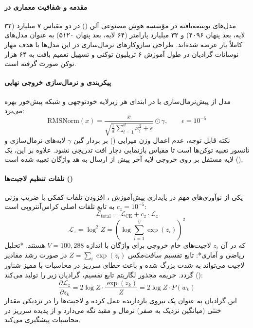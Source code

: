 \item {}

\paragraph*{مقدمه و شفافیت معماری در }
مدل‌های  \cite{olmo2025olmo3} توسعه‌یافته در مؤسسه هوش مصنوعی آلن () در دو مقیاس ۷ میلیارد (۳۲ لایه، بعد پنهان ۴۰۹۶) و ۳۲ میلیارد پارامتر (۶۴ لایه، بعد پنهان ۵۱۲۰) به عنوان مدل‌های کاملاً باز عرضه شده‌اند. طراحی سازوکارهای نرمال‌سازی در این مدل‌ها با هدف مهار نوسانات گرادیان در طول آموزش ۶ تریلیون توکنی و تسهیل تعمیم بافت به ۶۴ هزار توکن صورت گرفته است.

\paragraph*{پیکربندی  و نرمال‌سازی خروجی نهایی}
مدل  از پیش‌نرمال‌سازی با  در ابتدای هر زیرلایه خودتوجهی و شبکه پیش‌خور  بهره می‌برد:
\begin{equation}
    \text{RMSNorm}(x) = \frac{x}{\sqrt{\frac{1}{d}\sum_{i=1}^d x_i^2 + \epsilon}} \odot \gamma, \qquad \epsilon = 10^{-5}
\end{equation}
نکته قابل توجه، عدم اعمال وزن میرایی () بر بردار گین $\gamma$ لایه‌های نرمال‌سازی و تانسور تعبیه توکن‌ها است تا مقیاس بازنمایی دچار افت تدریجی نشود. علاوه بر این، یک لایه  مستقل بر روی خروجی لایه آخر پیش از ارسال به هد واژگان تعبیه شده است ().

\paragraph*{تلفات تنظیم لاجیت‌ها ()}
یکی از نوآوری‌های مهم در پایداری پیش‌آموزش ، افزودن تلفات کمکی  با ضریب وزنی $c_z = 10^{-5}$ به تابع تلفات اصلی کراس‌آنتروپی است:
\begin{equation}
    \mathcal{L}_{\text{total}} = \mathcal{L}_{\text{CE}} + c_z \cdot \mathcal{L}_z
\end{equation}
\begin{equation}
    \mathcal{L}_z = \log^2 Z = \left( \log \sum_{i=1}^V \exp(z_i) \right)^2
\end{equation}
که در آن $z_i$ لاجیت‌های خام خروجی برای واژگان با اندازه $V = 100,288$ هستند.
*تحلیل ریاضی و آماری*: تابع تقسیم سافت‌مکس $Z = \sum_i \exp(z_i)$ در صورت رشد مقادیر لاجیت می‌تواند به شدت بزرگ شده و باعث خطای سرریز در محاسبات با ممیز شناور () گردد. جریمه مجذور لگاریتم تابع تقسیم، گرادیان زیر را تولید می‌کند:
\begin{equation}
    \frac{\partial \mathcal{L}_z}{\partial z_k} = 2 \log Z \cdot \frac{\exp(z_k)}{Z} = 2 \log Z \cdot P(w_k)
\end{equation}
این گرادیان به عنوان یک نیروی بازدارنده عمل کرده و لاجیت‌ها را در نزدیکی مقدار خنثی (میانگین نزدیک به صفر) نرمال و مقید نگه می‌دارد و از پدیده سرریز در محاسبات پیشگیری می‌کند.

